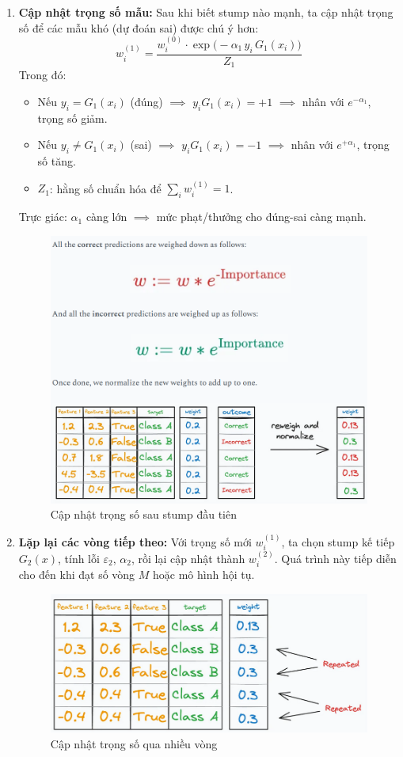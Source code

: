 \documentclass[11pt]{article}
\begin{document}
\begin{enumerate}
  \item \textbf{Cập nhật trọng số mẫu:}  
    Sau khi biết stump nào mạnh, ta cập nhật trọng số để các mẫu khó (dự đoán sai) được chú ý hơn:  
    \[
    w_i^{(1)} = \frac{w_i^{(0)} \cdot \exp\big(-\alpha_1 \, y_i \, G_1(x_i)\big)}{Z_1}
    \]  
    Trong đó:  
    \begin{itemize}
        \item Nếu \(y_i = G_1(x_i)\) (đúng) \(\implies\) \(y_i G_1(x_i) = +1\) \(\implies\) nhân với \(e^{-\alpha_1}\), trọng số giảm.  
        \item Nếu \(y_i \neq G_1(x_i)\) (sai) \(\implies\) \(y_i G_1(x_i) = -1\) \(\implies\) nhân với \(e^{+\alpha_1}\), trọng số tăng.  
        \item \(Z_1\): hằng số chuẩn hóa để \(\sum_i w_i^{(1)} = 1\).  
    \end{itemize}

    Trực giác: \(\alpha_1\) càng lớn \(\implies\) mức phạt/thưởng cho đúng-sai càng mạnh.

    \begin{figure}[H]
    \centering
    \includegraphics[width=0.7\linewidth]{images/ada_pipeline_6.png}
    \caption{Cập nhật trọng số sau stump đầu tiên}
    \end{figure}

  \item \textbf{Lặp lại các vòng tiếp theo:}  
    Với trọng số mới \(w_i^{(1)}\), ta chọn stump kế tiếp \(G_2(x)\), tính lỗi \(\varepsilon_2\), \(\alpha_2\), rồi lại cập nhật thành \(w_i^{(2)}\).  
    Quá trình này tiếp diễn cho đến khi đạt số vòng \(M\) hoặc mô hình hội tụ.

    \begin{figure}[H]
    \centering
    \includegraphics[width=0.7\linewidth]{images/ada_pipeline_7.png}
    \caption{Cập nhật trọng số qua nhiều vòng}
    \end{figure}


\end{enumerate}
\end{document}
